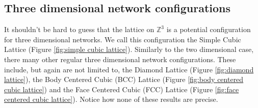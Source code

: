 \subsection*{Three dimensional network configurations}
It shouldn't be hard to guess that the lattice on $\mathbb{Z}^3$ is a potential configuration for three dimensional networks. We call this configuration the Simple Cubic Lattice (Figure
\ref{fig:simple cubic lattice}). Similarly to
the two dimensional case, there many other regular three dimensional network configurations. These include, but again are not limited to, the Diamond Lattice (Figure
\ref{fig:diamond lattice}), the Body Centered Cubic (BCC) Lattice (Figure \ref{fig:body centered cubic lattice}) and the Face Centered Cubic (FCC) Lattice (Figure \ref{fig:face
centered cubic lattice}). Notice how none of these results are precise.

